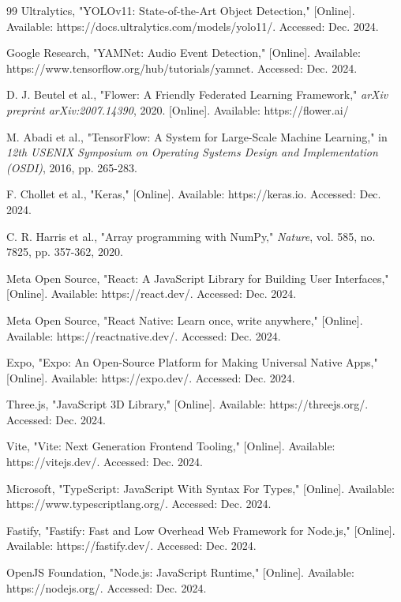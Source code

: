 \documentclass[conference]{IEEEtran}
\begin{document}
\begin{thebibliography}{99}
Ultralytics, "YOLOv11: State-of-the-Art Object Detection," [Online]. Available: https://docs.ultralytics.com/models/yolo11/. Accessed: Dec. 2024.

Google Research, "YAMNet: Audio Event Detection," [Online]. Available: https://www.tensorflow.org/hub/tutorials/yamnet. Accessed: Dec. 2024.

D. J. Beutel et al., "Flower: A Friendly Federated Learning Framework," \textit{arXiv preprint arXiv:2007.14390}, 2020. [Online]. Available: https://flower.ai/

M. Abadi et al., "TensorFlow: A System for Large-Scale Machine Learning," in \textit{12th USENIX Symposium on Operating Systems Design and Implementation (OSDI)}, 2016, pp. 265-283.

F. Chollet et al., "Keras," [Online]. Available: https://keras.io. Accessed: Dec. 2024.

C. R. Harris et al., "Array programming with NumPy," \textit{Nature}, vol. 585, no. 7825, pp. 357-362, 2020.

Meta Open Source, "React: A JavaScript Library for Building User Interfaces," [Online]. Available: https://react.dev/. Accessed: Dec. 2024.

Meta Open Source, "React Native: Learn once, write anywhere," [Online]. Available: https://reactnative.dev/. Accessed: Dec. 2024.

Expo, "Expo: An Open-Source Platform for Making Universal Native Apps," [Online]. Available: https://expo.dev/. Accessed: Dec. 2024.

Three.js, "JavaScript 3D Library," [Online]. Available: https://threejs.org/. Accessed: Dec. 2024.

Vite, "Vite: Next Generation Frontend Tooling," [Online]. Available: https://vitejs.dev/. Accessed: Dec. 2024.

Microsoft, "TypeScript: JavaScript With Syntax For Types," [Online]. Available: https://www.typescriptlang.org/. Accessed: Dec. 2024.

Fastify, "Fastify: Fast and Low Overhead Web Framework for Node.js," [Online]. Available: https://fastify.dev/. Accessed: Dec. 2024.

OpenJS Foundation, "Node.js: JavaScript Runtime," [Online]. Available: https://nodejs.org/. Accessed: Dec. 2024.


\end{thebibliography}
\end{document}
